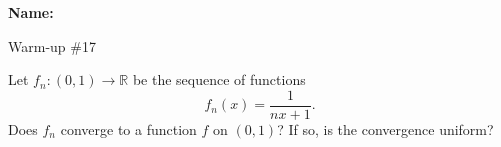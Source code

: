 \documentclass[12pt]{article}
\begin{document}
\noindent \textbf{Name:} 

\begin{center}
Warm-up \#17
\end{center}

\noindent Let $f_n : (0,1) \to \mathbb{R}$ be the sequence of functions 
\[
f_n(x) = \frac{1}{nx + 1}.
\]
Does $f_n$ converge to a function $f$ on $(0,1)$? If so, is the convergence uniform? 
\end{document}
